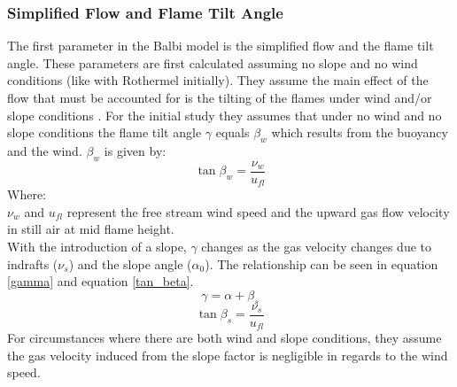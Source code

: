 \documentclass{article}
\begin{document}
\subsubsection{Simplified Flow and Flame Tilt Angle}
\indent The first parameter in the Balbi model is the simplified flow and the flame tilt angle. These parameters are first calculated assuming no slope and no wind conditions (like with Rothermel initially). They assume the main effect of the flow that must be accounted for is the tilting of the flames under wind and/or slope conditions \citep{Balbi2007}. For the initial study they assumes that under no wind and no slope conditions the flame tilt angle $\gamma$ equals $\beta _ w$ which results from the buoyancy and the wind. $\beta _w$ is given by:
\begin{equation}
	\label{beta_w}
	\tan \beta _ w = \frac {\nu _ w} {u_{fl}}
\end{equation}
Where:\\
 $\nu _ w$ and $u_{fl}$ represent the free stream wind speed and the upward gas flow velocity in still air at mid flame height. \\
\indent With the introduction of a slope, $\gamma$ changes as the gas velocity changes due to indrafts ($\nu _ s$) and the slope angle ($\alpha _0$). The relationship can be seen in equation \ref{gamma} and equation \ref{tan_beta}. 
\begin{equation}
	\label{gamma}
	\gamma = \alpha + \beta _ s
\end{equation}
\begin{equation}
	\label{tan_beta}
	\tan \beta _ s = \frac {\nu _ s} {u_{fl}}
\end{equation}
\indent For circumstances where there are both wind and slope conditions, they assume the gas velocity induced from the slope factor is negligible in regards to the wind speed.
\end{document}
